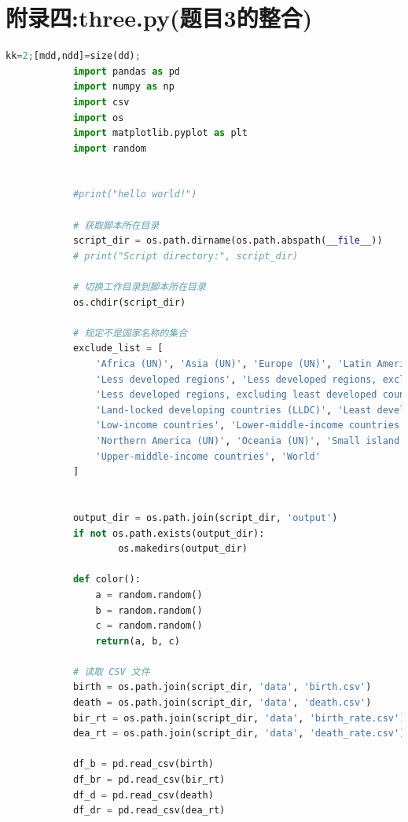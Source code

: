 \documentclass{ctexart}
\begin{document}
    \section{附录四:three.py(题目3的整合)}
    \tiny
        \begin{lstlisting}[language=Python] %设置不同语言即可。
            kk=2;[mdd,ndd]=size(dd);
            import pandas as pd
            import numpy as np
            import csv
            import os
            import matplotlib.pyplot as plt
            import random


            #print("hello world!")

            # 获取脚本所在目录
            script_dir = os.path.dirname(os.path.abspath(__file__))
            # print("Script directory:", script_dir)

            # 切换工作目录到脚本所在目录
            os.chdir(script_dir)

            # 规定不是国家名称的集合
            exclude_list = [
                'Africa (UN)', 'Asia (UN)', 'Europe (UN)', 'Latin America and the Caribbean (UN)', 
                'Less developed regions', 'Less developed regions, excluding China', 
                'Less developed regions, excluding least developed countries', 'High-income countries', 
                'Land-locked developing countries (LLDC)', 'Least developed countries', 
                'Low-income countries', 'Lower-middle-income countries', 'More developed regions', 
                'Northern America (UN)', 'Oceania (UN)', 'Small island developing states (SIDS)', 
                'Upper-middle-income countries', 'World'
            ]


            output_dir = os.path.join(script_dir, 'output')
            if not os.path.exists(output_dir):
                    os.makedirs(output_dir)

            def color():
                a = random.random()
                b = random.random()
                c = random.random()
                return(a, b, c)

            # 读取 CSV 文件
            birth = os.path.join(script_dir, 'data', 'birth.csv')
            death = os.path.join(script_dir, 'data', 'death.csv')
            bir_rt = os.path.join(script_dir, 'data', 'birth_rate.csv')
            dea_rt = os.path.join(script_dir, 'data', 'death_rate.csv')

            df_b = pd.read_csv(birth)
            df_br = pd.read_csv(bir_rt)
            df_d = pd.read_csv(death)
            df_dr = pd.read_csv(dea_rt)


\end{lstlisting}
\end{document}
